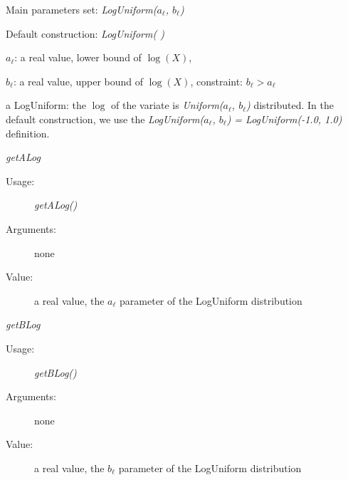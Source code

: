 \begin{description}

\item[Usage:] \rule{0pt}{1em}
\begin{description}
\item Main parameters set: \textit{LogUniform($a_\ell$, $b_\ell$)}
\item Default construction: \textit{LogUniform( )}
\end{description}

\item[Arguments:]  \rule{0pt}{1em}
\begin{description}
\item $a_\ell$: a real value, lower bound of $\log(X)$,
\item $b_\ell$: a real value, upper bound of $\log(X)$, constraint: $b_\ell>a_\ell$
\end{description}

\item[Value:] a LogUniform: the $\log$ of the variate is \textit{Uniform($a_\ell$, $b_\ell$)} distributed. In the default construction, we use the \textit{LogUniform($a_\ell$, $b_\ell$) = LogUniform(-1.0, 1.0)} definition.

\item[Some methods:] \rule{0pt}{1em}
\begin{description}
\item \textit{getALog}
\begin{description}
\item[Usage:] \textit{getALog()}
\item[Arguments:] none
\item[Value:]  a real value,  the $a_\ell$ parameter of the LogUniform distribution
\end{description}
\bigskip
\item \textit{getBLog}
\begin{description}
\item[Usage:] \textit{getBLog()}
\item[Arguments:] none
\item[Value:]  a real value,  the $b_\ell$ parameter of the LogUniform distribution
\end{description}
\bigskip


\end{description}
\end{description}
